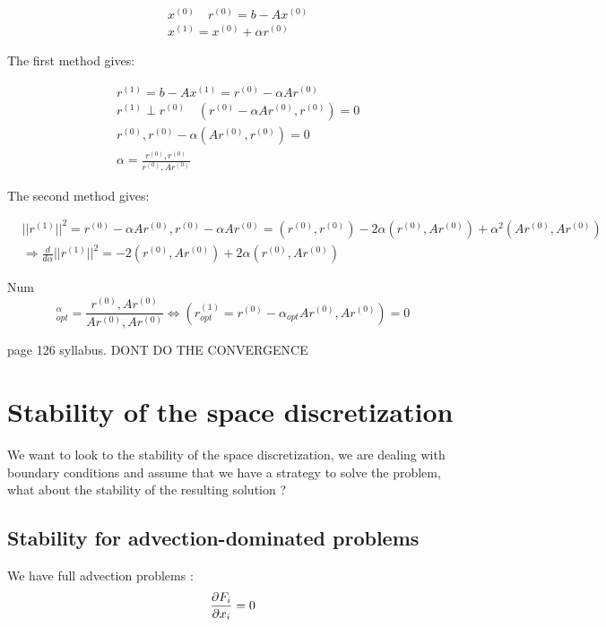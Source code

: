 \begin{equation}
\begin{aligned}
&x^{(0)} \quad r^{(0)} = b-Ax^{(0)} \\
&x^{(1)} = x^{(0)} + \alpha r^{(0)}
\end{aligned}
\end{equation}

The first method gives: 

\begin{equation}
\begin{aligned}
&r^{(1)} = b-Ax^{(1)} = r^{(0)} - \alpha A r^{(0)}\\
&r^{(1)} \perp r^{(0)} \quad (r^{(0)}- \alpha A r^{(0)}, r^{(0)}) = 0 \\
&r^{(0)}, r^{(0)} - \alpha (Ar^{(0)}, r^{(0)}) = 0\\
&\alpha = \frac{r^{(0)},r^{(0)}}{r^{(0)},Ar^{(0)}} 
\end{aligned}
\end{equation}

The second method gives: 

\begin{equation}
\begin{aligned}
&||r^{(1)}||^2 = r^{(0)}-\alpha A r^{(0)}, r^{(0)}-\alpha A r^{(0)} = (r^{(0)},r^{(0)}) - 2\alpha (r^{(0)},A r^{(0)})+ \alpha ^2(Ar^{(0)}, Ar^{(0)})\\
&\Rightarrow \frac{d}{d\alpha} ||r^{(1)}||^2 = -2(r^{(0)}, Ar^{(0)}) + 2\alpha (r^{(0)}, A r^{(0)})
\end{aligned}
\end{equation}

Num
\begin{equation}
^\alpha _{opt} = \frac{r^{(0)},Ar^{(0)}}{Ar^{(0)},Ar^{(0)}} \Leftrightarrow (r_{opt}^{(1)}= r^{(0)}-\alpha _{opt} A r^{(0)}, Ar^{(0)}) = 0
\end{equation}

page 126 syllabus. DONT DO THE CONVERGENCE 


\section{Stability of the space discretization}
We want to look to the stability of the space discretization, we are dealing with boundary conditions and assume that we have a strategy to solve the problem, what about the stability of the resulting solution ?

\subsection{Stability for advection-dominated problems}
We have full advection problems :
\begin{equation}
\frac{\partial F_i}{\partial x_i} = 0
\end{equation}

